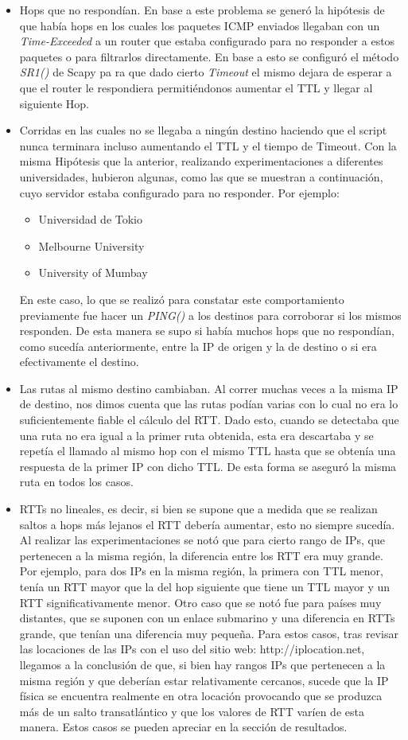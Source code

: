 \begin{itemize}
    \item Hops que no respondían. En base a este problema se generó la hipótesis de que había hops en los cuales los paquetes ICMP enviados llegaban con un \textit{Time-Exceeded} a un router que estaba configurado para no responder a estos paquetes o para filtrarlos directamente. En base a esto se configuró el método \textit{SR1()} de Scapy pa ra que dado cierto \textit{Timeout} el mismo dejara de esperar a que el router le respondiera permitiéndonos aumentar el TTL y llegar al siguiente Hop.
    \item Corridas en las cuales no se llegaba a ningún destino haciendo que el script nunca terminara incluso aumentando el TTL y el tiempo de Timeout. Con la misma Hipótesis que la anterior, realizando experimentaciones a diferentes universidades, hubieron algunas, como las que se muestran a continuación, cuyo servidor estaba configurado para no responder. Por ejemplo:
    \begin{itemize}
        \item Universidad de Tokio
        \item Melbourne University
        \item University of Mumbay
    \end{itemize}
    En este caso, lo que se realizó para constatar este comportamiento previamente fue hacer un \textit{PING()} a los destinos para corroborar si los mismos responden. De esta manera se supo si había muchos hops que no respondían, como sucedía anteriormente, entre la IP de origen y la de destino o si era efectivamente el destino.
    \item Las rutas al mismo destino cambiaban. Al correr muchas veces a la misma IP de destino, nos dimos cuenta que las rutas podían varias con lo cual no era lo suficientemente fiable el cálculo del RTT. Dado esto, cuando se detectaba que una ruta no era igual a la primer ruta obtenida, esta era descartaba y se repetía el llamado al mismo hop con el mismo TTL hasta que se obtenía una respuesta de la primer IP con dicho TTL. De esta forma se aseguró la misma ruta en todos los casos.
    \item RTTs no lineales, es decir, si bien se supone que a medida que se realizan saltos a hops más lejanos el RTT debería aumentar, esto no siempre sucedía. Al realizar las experimentaciones se notó que para cierto rango de IPs, que pertenecen a la misma región, la diferencia entre los RTT era muy grande. Por ejemplo, para dos IPs en la misma región, la primera con TTL menor, tenía un RTT mayor que la del hop siguiente que tiene un TTL mayor y un RTT significativamente menor. Otro caso que se notó fue para países muy distantes, que se suponen con un enlace submarino y una diferencia en RTTs grande, que tenían una diferencia muy pequeña. Para estos casos, tras revisar las locaciones de las IPs con el uso del sitio web: http://iplocation.net, llegamos a la conclusión de que, si bien hay rangos IPs que pertenecen a la misma región y que deberían estar relativamente cercanos, sucede que la IP física se encuentra realmente en otra locación provocando que se produzca más de un salto transatlántico y que los valores de RTT varíen de esta manera. Estos casos se pueden apreciar en la sección de resultados.  

\end{itemize}

